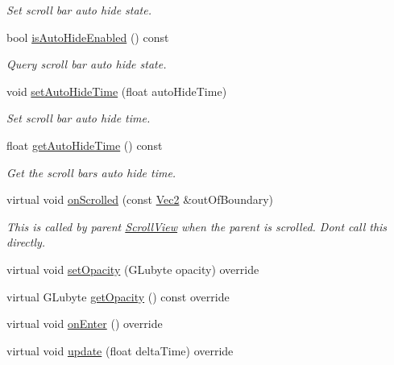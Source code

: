 \begin{DoxyCompactItemize}
\begin{DoxyCompactList}\small\item\em Set scroll bar auto hide state. \end{DoxyCompactList}\item 
bool \hyperlink{classui_1_1ScrollViewBar_a23ca5a96001bc47c61f8d4b382ff8d02}{is\+Auto\+Hide\+Enabled} () const
\begin{DoxyCompactList}\small\item\em Query scroll bar auto hide state. \end{DoxyCompactList}\item 
void \hyperlink{classui_1_1ScrollViewBar_a98512e5a256ba825ed8d0b2c8a5905c9}{set\+Auto\+Hide\+Time} (float auto\+Hide\+Time)
\begin{DoxyCompactList}\small\item\em Set scroll bar auto hide time. \end{DoxyCompactList}\item 
float \hyperlink{classui_1_1ScrollViewBar_ac1fcff0b4e6907a3db3c5bfab513fa07}{get\+Auto\+Hide\+Time} () const
\begin{DoxyCompactList}\small\item\em Get the scroll bar\textquotesingle{}s auto hide time. \end{DoxyCompactList}\item 
virtual void \hyperlink{classui_1_1ScrollViewBar_a7a42d2973e1b1bb1cdd2c48b121ed190}{on\+Scrolled} (const \hyperlink{classVec2}{Vec2} \&out\+Of\+Boundary)
\begin{DoxyCompactList}\small\item\em This is called by parent \hyperlink{classui_1_1ScrollView}{Scroll\+View} when the parent is scrolled. Don\textquotesingle{}t call this directly. \end{DoxyCompactList}\item 
virtual void \hyperlink{classui_1_1ScrollViewBar_a89da6d683d0157d90c93b559e90c69e3}{set\+Opacity} (G\+Lubyte opacity) override
\item 
virtual G\+Lubyte \hyperlink{classui_1_1ScrollViewBar_a6c36fff342601b1ab29afaed5e4e201d}{get\+Opacity} () const override
\item 
virtual void \hyperlink{classui_1_1ScrollViewBar_a6cf525ed1ead2a5b8e45de981bf2d0c1}{on\+Enter} () override
\item 
virtual void \hyperlink{classui_1_1ScrollViewBar_a26112897dfbfd6d3d727337f65177f1f}{update} (float delta\+Time) override
\item 
\mbox{\label{classui_1_1ScrollViewBar_a140a5400e240869c9295eec8ddf7823b}} 

\end{DoxyCompactItemize}
